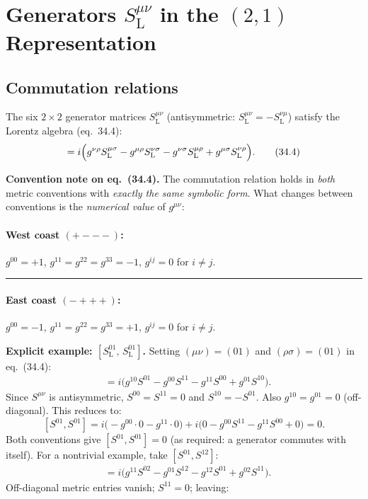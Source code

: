 \documentclass[12pt]{article}
\begin{document}
\section{Generators \texorpdfstring{$S^{\mu\nu}_{\mathrm{L}}$}{S\^{}munu\_L}
         in the $(2,1)$ Representation}

\subsection{Commutation relations}

The six $2\times 2$ generator matrices $S^{\mu\nu}_{\mathrm{L}}$
(antisymmetric: $S^{\mu\nu}_{\mathrm{L}} = -S^{\nu\mu}_{\mathrm{L}}$)
satisfy the Lorentz algebra (eq.~34.4):
\begin{equation}
  [S^{\mu\nu}_{\mathrm{L}},\, S^{\rho\sigma}_{\mathrm{L}}]
  = i\Bigl(
      g^{\nu\rho} S^{\mu\sigma}_{\mathrm{L}}
    - g^{\mu\rho} S^{\nu\sigma}_{\mathrm{L}}
    - g^{\nu\sigma} S^{\mu\rho}_{\mathrm{L}}
    + g^{\mu\sigma} S^{\nu\rho}_{\mathrm{L}}
    \Bigr).
  \tag{34.4}
\end{equation}

\noindent\textbf{Convention note on eq.~(34.4).}
The commutation relation holds in \emph{both} metric conventions with
\emph{exactly the same symbolic form}.
What changes between conventions is the \emph{numerical value} of $g^{\mu\nu}$:

\paragraph{West coast $(+{-}{-}{-})$:} $g^{00}=+1$,\; $g^{11}=g^{22}=g^{33}=-1$,\; $g^{ij}=0$ for $i\neq j$.

\medskip\noindent\rule{\linewidth}{0.4pt}\medskip

\paragraph{East coast $(-{+}{+}{+})$:} $g^{00}=-1$,\; $g^{11}=g^{22}=g^{33}=+1$,\; $g^{ij}=0$ for $i\neq j$.

\medskip

\noindent\textbf{Explicit example: $[S^{01}_{\mathrm{L}},\, S^{01}_{\mathrm{L}}]$.}
Setting $(\mu\nu)=(01)$ and $(\rho\sigma)=(01)$ in eq.~(34.4):
\begin{align*}
  [S^{01},S^{01}]
  &= i\bigl(g^{10}S^{01} - g^{00}S^{11} - g^{11}S^{00} + g^{01}S^{10}\bigr).
\end{align*}
Since $S^{\mu\nu}$ is antisymmetric, $S^{00}=S^{11}=0$ and $S^{10}=-S^{01}$.
Also $g^{10}=g^{01}=0$ (off-diagonal). This reduces to:
\[
  [S^{01},S^{01}] = i\bigl(-g^{00}\cdot 0 - g^{11}\cdot 0\bigr)
  + i\bigl(0 - g^{00}S^{11} - g^{11}S^{00} + 0\bigr) = 0.
\]
Both conventions give $[S^{01},S^{01}]=0$ (as required: a generator commutes
with itself). For a nontrivial example, take $[S^{01},S^{12}]$:
\begin{align*}
  [S^{01},S^{12}]
  &= i\bigl(g^{11}S^{02} - g^{01}S^{12} - g^{12}S^{01} + g^{02}S^{11}\bigr).
\end{align*}
Off-diagonal metric entries vanish; $S^{11}=0$; leaving:
\end{document}
